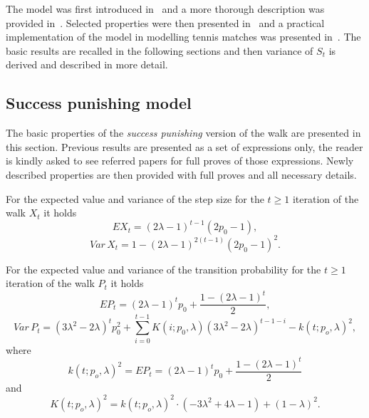 \documentclass[runningheads]{CMSIM}
\begin{document}
    The model was first introduced in~\cite{ja2017ddny} and a more thorough
    description was provided in~\cite{ja2019teze}.
    Selected properties
    were then presented in~\cite{ja2019apmat} and a practical implementation
    of the model in modelling tennis matches was presented in~\cite{ja2019mathsport_proc}.
    The basic results are recalled in the following sections and then
    variance of $S_{t}$ is derived and described in more detail.

    \subsection{Success punishing model}\label{subsec:success-punishing-model}

    The basic properties of the \emph{success punishing }version of the
    walk are presented in this section.
    Previous results are presented
    as a set of expressions only, the reader is kindly asked to see referred
    papers for full proves of those expressions.
    Newly described properties
    are then provided with full proves and all necessary details.

    For the expected value and variance of the step size for the $t\ge1$
    iteration of the walk $X_{t}$ it holds~\cite{ja2019apmat}
    \begin{equation}
        EX_{t}=(2\lambda-1)^{t-1}(2p_{0}-1),\label{eq:e_x_t_sp}
    \end{equation}
    \begin{equation}
        Var\,X_{t}=1-(2\lambda-1)^{2(t-1)}(2p_{0}-1)^{2}.\label{eq:var_x_t_sp}
    \end{equation}

    For the expected value and variance of the transition probability
    for the $t\ge1$ iteration of the walk $P_{t}$ it holds~\cite{ja2017ddny,ja2019apmat}
    \begin{equation}
        EP_{t}=(2\lambda-1)^{t}p_{0}+\frac{1-(2\lambda-1)^{t}}{2},\label{eq:e_p_t_sp}
    \end{equation}
    \begin{equation}
        Var\,P_{t}=(3\lambda^{2}-2\lambda)^{t}p_{0}^{2}+\sum_{i=0}^{t-1}K(i;p_{0},\lambda)(3\lambda^{2}-2\lambda)^{t-1-i}-k(t;p_{o},\lambda)^{2},\label{eq:var_p_t_sp}
    \end{equation}
    where
    \[
        k(t;p_{o},\lambda)^{2}=EP_{t}=(2\lambda-1)^{t}p_{0}+\frac{1-(2\lambda-1)^{t}}{2}
    \]
    and
    \[
        K(t;p_{o},\lambda)^{2}=k(t;p_{o},\lambda)^{2}\cdot(-3\lambda^{2}+4\lambda-1)+(1-\lambda)^{2}.
    \]
\end{document}
